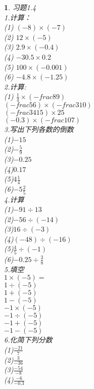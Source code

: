 \documentclass[11pt]{article}
\newtheorem{exercise}{ }
\begin{document}
\begin{exercise}
习题1.4\\
1.计算：\\
(1)
$(-8)\times(-7)$\\
(2)
$12\times(-5)$\\
(3)
$2.9\times(-0.4)$\\
(4)
$-30.5\times0.2$\\
(5)
$100\times(-0.001)$\\
(6)
$-4.8\times(-1.25)$\\

2.计算:\\
(1)
$\frac{1}{4}\times(-frac{8}{9})$\\
$(-frac{5}{6})\times(-frac{3}{10})$\\
$(-frac{34}{15})\times25$\\
$(-0.3)\times(-frac{10}{7})$\\

3.写出下列各数的倒数\\
(1)$-15$\\
(2)$-\frac{5}{9}$\\
(3)$-0.25$\\
(4)$0.17$\\
(5)$4\frac{1}{4}$\\
(6)$-5\frac{2}{5}$\\

4.计算\\
(1)$-91\div13$\\
(2)$-56\div(-14)$\\
(3)$16\div(-3)$\\
(4)$(-48)\div(-16)$\\
(5)$\frac{4}{5}\div(-1)$\\
(6)$-0.25\div\frac{3}{8}$\\

5.填空\\
$1\times(-5)=$\\
$1\div(-5)$\\
$1+(-5)$\\
$1-(-5)$\\
$-1\times(-5)$\\
$-1\div(-5)$\\
$-1+(-5)$\\
$-1-(-5)$\\

6.化简下列分数\\
(1)$\frac{-21}{7}$\\
(2)$\frac{3}{-36}$\\
(3)$\frac{-54}{-8}$\\
(4)$\frac{-6}{-0.3}$\\


\end{exercise}
\end{document}
